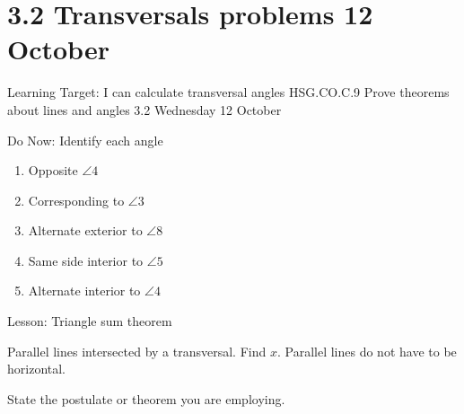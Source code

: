 \section{3.2 Transversals problems \hfill 12 October}
\begin{frame}{Learning Target: I can calculate transversal angles}
  {HSG.CO.C.9 Prove theorems about lines and angles  \hfill \alert{3.2 Wednesday 12 October}}
  \begin{block}{Do Now: Identify each angle}
    \begin{multicols}{2}
    \begin{enumerate}
      \item Opposite $\angle 4$
      \item Corresponding to $\angle 3$
      \item Alternate exterior to $\angle 8$
      \item Same side interior to $\angle 5$
      \item Alternate interior to $\angle 4$
  \end{enumerate}
  \begin{center}
  \end{center}
\end{multicols}
\end{block}
Lesson: Triangle sum theorem
\end{frame}

\begin{frame}{Parallel lines intersected by a transversal. Find $x$.}
  {Parallel lines do not have to be horizontal.}
  \begin{flushleft}
    \end{flushleft}
    State the postulate or theorem you are employing.
\end{frame}

